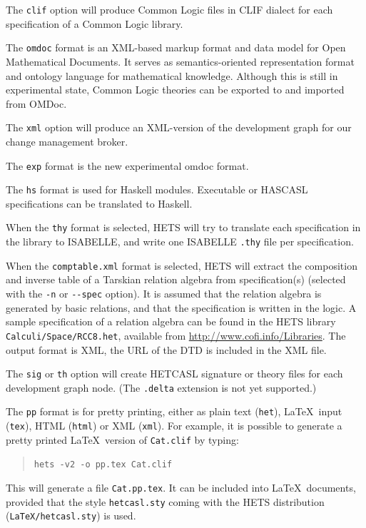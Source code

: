 \documentclass{article}
\newcommand{\normalTEXTSC}[2]{{#1\scriptsize#2}}
\newcommand     {\Hets}{\normalTEXTSC{H}{ETS}\xspace}
\newcommand     {\Isabelle}{\normalTEXTSC{I}{SABELLE}\xspace}
\newcommand     {\HasCASL}{\normalTEXTSC{H}{AS}\normalTEXTSC{C}{ASL}\xspace}
\newcommand{\HetCASL}{\normalTEXTSC{H}{ET}\normalTEXTSC{C}{ASL}\xspace}
\begin{document}
\begin{description}
The \texttt{clif} option will produce Common Logic files in
CLIF dialect for each specification of a Common Logic library.

The \texttt{omdoc} format \cite{books/sp/Kohlhase06} is an XML-based
markup format and data model for Open Mathematical Documents. It
serves as semantics-oriented representation format and ontology
language for mathematical knowledge. Although this is still in experimental 
state, Common Logic theories can be exported to and imported from OMDoc.

The \texttt{xml} option will produce an XML-version of the development graph
for our change management broker.

The \texttt{exp} format is the new experimental omdoc format.

The \texttt{hs} format is used for Haskell modules. Executable \CASL or
\HasCASL specifications can be translated to Haskell.

When the \texttt{thy} format is selected, \Hets will try to translate
each specification in the library to \Isabelle, and write one \Isabelle
\texttt{.thy} file per specification.

When the \texttt{comptable.xml} format is selected, \Hets will extract
the composition and inverse table of a Tarskian relation algebra from
specification(s) (selected with the \texttt{-n} or \texttt{-{}-spec}
option). It is assumed that the relation algebra is
generated by basic relations, and that the specification is written
in the \CASL logic. A sample specification of a relation
algebra can be found in the \Hets library \texttt{Calculi/Space/RCC8.het},
available from \url{http://www.cofi.info/Libraries}.
The output format is XML, the URL of the DTD is included in the
XML file.

The \texttt{sig} or \texttt{th} option will create \HetCASL signature or
theory files for each development graph node. (The \texttt{.delta} extension
is not yet supported.)

The \texttt{pp} format is for pretty printing, either as plain text
(\texttt{het}), \LaTeX\ input (\texttt{tex}), HTML (\texttt{html}) or XML
(\texttt{xml}).  For example, it is possible to generate a pretty printed
\LaTeX\ version of \texttt{Cat.clif} by typing:

\begin{quote}
\texttt{hets -v2 -o pp.tex Cat.clif}
\end{quote}

This will generate a file \texttt{Cat.pp.tex}. It can be included
into \LaTeX\ documents, provided that the style \texttt{hetcasl.sty}
coming with the \Hets distribution (\texttt{LaTeX/hetcasl.sty}) is used.


\end{description}
\end{document}
